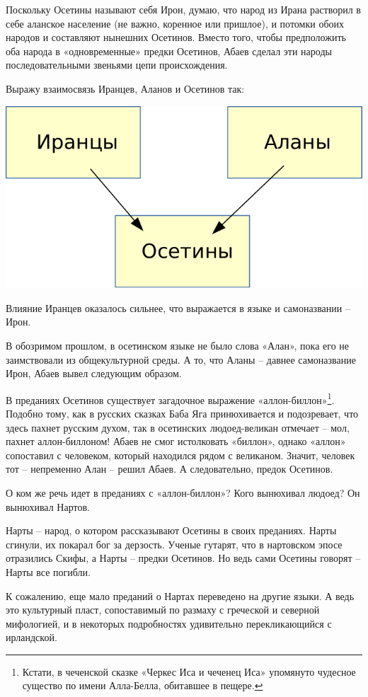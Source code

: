 Поскольку Осетины называют себя Ирон, думаю, что народ из Ирана растворил в себе аланское население (не важно, коренное или пришлое), и потомки обоих народов и составляют нынешних Осетинов. Вместо того, чтобы предположить оба народа в «одновременные» предки Осетинов, Абаев сделал эти народы последовательными звеньями цепи происхождения.

Выражу взаимосвязь Иранцев, Аланов и Осетинов так:

\begin{center}
\includegraphics[width=0.50\linewidth]{chast-colebanie-osnov/okartah/iron01.pdf}
\end{center}

Влияние Иранцев оказалось сильнее, что выражается в языке и самоназвании – Ирон.

В обозримом прошлом, в осетинском языке не было слова «Алан», пока его не заимствовали из общекультурной среды. А то, что Аланы – давнее самоназвание Ирон, Абаев вывел следующим образом.
 
В преданиях Осетинов существует загадочное выражение «аллон-биллон»\footnote{Кстати, в чеченской сказке «Черкес Иса и чеченец Иса» упомянуто чудесное существо по имени Алла-Белла, обитавшее в пещере.}. Подобно тому, как в русских сказках Баба Яга принюхивается и подозревает, что здесь пахнет русским духом, так в осетинских людоед-великан отмечает – мол, пахнет аллон-биллоном! Абаев не смог истолковать «биллон», однако «аллон» сопоставил с человеком, который находился рядом с великаном. Значит, человек тот – непременно Алан – решил Абаев. А следовательно, предок Осетинов.

О ком же речь идет в преданиях с «аллон-биллон»? Кого вынюхивал людоед? Он вынюхивал Нартов. 

Нарты – народ, о котором рассказывают Осетины в своих преданиях. Нарты сгинули, их покарал бог за дерзость. Ученые гутарят, что в нартовском эпосе отразились Скифы, а Нарты – предки Осетинов. Но ведь сами Осетины говорят – Нарты все погибли. 

К сожалению, еще мало преданий о Нартах переведено на другие языки. А ведь это культурный пласт, сопоставимый по размаху с греческой и северной мифологией, и в некоторых подробностях удивительно перекликающийся с ирландской.

